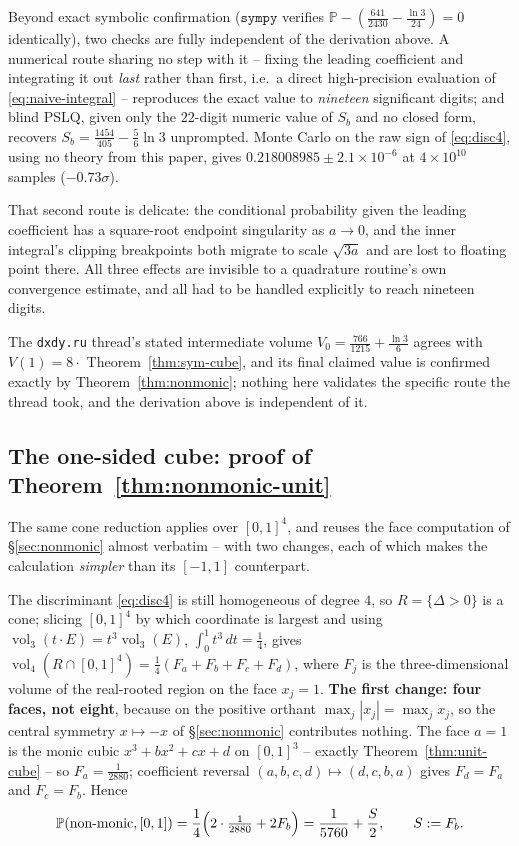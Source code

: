 \documentclass[11pt,reqno]{amsart}
\theoremstyle{plain}
\theoremstyle{remark}
\DeclareMathOperator{\vol}{vol}
\newcommand{\Prb}{\mathbb{P}}
\newcommand{\disc}{\Delta}
\begin{document}
Beyond exact symbolic confirmation ($\texttt{sympy}$ verifies
$\Prb-(\tfrac{641}{2430}-\tfrac{\ln3}{24})=0$ identically), two checks are
fully independent of the derivation above. A numerical route sharing no step
with it -- fixing the leading coefficient and integrating it out \emph{last}
rather than first, i.e.\ a direct high-precision evaluation of
\eqref{eq:naive-integral} -- reproduces the exact value to \emph{nineteen}
significant digits; and blind PSLQ, given only the $22$-digit numeric value
of $S_b$ and no closed form, recovers $S_b=\tfrac{1454}{405}-\tfrac56\ln3$
unprompted. Monte Carlo on the raw sign of \eqref{eq:disc4}, using no theory
from this paper, gives $0.218008985\pm2.1\times10^{-6}$ at $4\times10^{10}$
samples ($-0.73\sigma$).

That second route is delicate: the conditional probability given the leading
coefficient has a square-root endpoint singularity as $a\to0$, and the inner
integral's clipping breakpoints both migrate to scale $\sqrt{3a}$ and are
lost to floating point there. All three effects are invisible to a quadrature
routine's own convergence estimate, and all had to be handled explicitly to
reach nineteen digits.

The \texttt{dxdy.ru} thread's stated intermediate volume
$V_0=\tfrac{766}{1215}+\tfrac{\ln3}{6}$ agrees with $V(1)=8\cdot$
Theorem~\ref{thm:sym-cube}, and its final claimed value is confirmed exactly
by Theorem~\ref{thm:nonmonic}; nothing here validates the specific route the
thread took, and the derivation above is independent of it.

\subsection{The one-sided cube: proof of Theorem~\ref{thm:nonmonic-unit}}
\label{sec:nonmonic-unit}

The same cone reduction applies over $[0,1]^4$, and reuses the face
computation of \S\ref{sec:nonmonic} almost verbatim -- with two changes, each
of which makes the calculation \emph{simpler} than its $[-1,1]$ counterpart.

The discriminant \eqref{eq:disc4} is still homogeneous of degree $4$, so
$R=\{\disc>0\}$ is a cone; slicing $[0,1]^4$ by which coordinate is largest
and using $\vol_3(t\cdot E)=t^3\vol_3(E)$, $\int_0^1t^3\,dt=\tfrac14$, gives
$\vol_4(R\cap[0,1]^4)=\tfrac14(F_a+F_b+F_c+F_d)$, where $F_j$ is the
three-dimensional volume of the real-rooted region on the face $x_j=1$.
\textbf{The first change: four faces, not eight}, because on the positive
orthant $\max_j|x_j|=\max_j x_j$, so the central symmetry $x\mapsto-x$ of
\S\ref{sec:nonmonic} contributes nothing. The face $a=1$ is the monic cubic
$x^3+bx^2+cx+d$ on $[0,1]^3$ -- exactly Theorem~\ref{thm:unit-cube} -- so
$F_a=\tfrac{1}{2880}$; coefficient reversal $(a,b,c,d)\mapsto(d,c,b,a)$ gives
$F_d=F_a$ and $F_c=F_b$. Hence
\begin{equation} \label{eq:cone-reduction-unit}
  \Prb(\text{non-monic},[0,1]) = \frac{1}{4}\Bigl(2\cdot\tfrac{1}{2880}+2F_b\Bigr)
  = \frac{1}{5760}+\frac{S}{2}, \qquad S:=F_b.
\end{equation}
\end{document}
